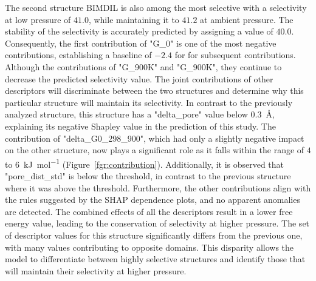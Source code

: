 \documentclass[main]{subfiles}
\begin{document}
The second structure BIMDIL is also among the most selective with a selectivity at low pressure of $41.0$, while maintaining it to $41.2$ at ambient pressure. The stability of the selectivity is accurately predicted by assigning a value of $40.0$. Consequently, the first contribution of "G\_0" is one of the most negative contributions, establishing a baseline of $-2.4$ for for subsequent contributions. Although the contributions of "G\_900K" and "G\_900K", they continue to decrease the predicted selectivity value. The joint contributions of other descriptors will discriminate between the two structures and determine why this particular structure will maintain its selectivity. In contrast to the previously analyzed structure, this structure has a "delta\_pore" value below \SI{0.3}{\angstrom}, explaining its negative Shapley value in the prediction of this study. The contribution of "delta\_G0\_298\_900", which had only a slightly negative impact on the other structure, now plays a significant role as it falls within the range of $4$ to \SI{6}{\kilo\joule\per\mole} (Figure~\ref{fgr:contribution}). Additionally, it is observed that "pore\_dist\_std" is below the threshold, in contrast to the previous structure where it was above the threshold. Furthermore, the other contributions align with the rules suggested by the SHAP dependence plots, and no apparent anomalies are detected. The combined effects of all the descriptors result in a lower free energy value, leading to the conservation of selectivity at higher pressure. The set of descriptor values for this structure significantly differs from the previous one, with many values contributing to opposite domains. This disparity allows the model to differentiate between highly selective structures and identify those that will maintain their selectivity at higher pressure.
\end{document}
